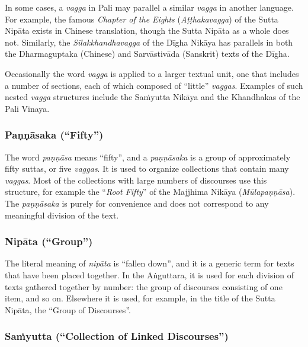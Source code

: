 \documentclass[12pt,openany]{book}%
\begin{document}
In some cases, a \textit{vagga} in Pali may parallel a similar \textit{vagga} in another language. For example, the famous \textit{Chapter of the Eights} (\textit{\textsanskrit{Aṭṭhakavagga}}) of the Sutta \textsanskrit{Nipāta} exists in Chinese translation, though the Sutta \textsanskrit{Nipāta} as a whole does not. Similarly, the \textit{\textsanskrit{Sīlakkhandhavagga}} of the \textsanskrit{Dīgha} \textsanskrit{Nikāya} has parallels in both the Dharmaguptaka (Chinese) and \textsanskrit{Sarvāstivāda} (Sanskrit) texts of the \textsanskrit{Dīgha}.

Occasionally the word \textit{vagga} is applied to a larger textual unit, one that includes a number of sections, each of which composed of “little” \textit{vaggas}. Examples of such nested \textit{vagga} structures include the \textsanskrit{Saṁyutta} \textsanskrit{Nikāya} and the Khandhakas of the Pali Vinaya.

\subsubsection*{\textsanskrit{Paṇṇāsaka} (“Fifty”)}

The word \textit{\textsanskrit{paṇṇāsa}} means “fifty”, and a \textit{\textsanskrit{paṇṇāsaka}} is a group of approximately fifty suttas, or five \textit{vaggas}. It is used to organize collections that contain many \textit{vaggas}. Most of the collections with large numbers of discourses use this structure, for example the “\textit{Root Fifty}” of the Majjhima \textsanskrit{Nikāya} (\textit{\textsanskrit{Mūlapaṇṇāsa}}). The \textit{\textsanskrit{paṇṇāsaka}} is purely for convenience and does not correspond to any meaningful division of the text.

\subsubsection*{\textsanskrit{Nipāta} (“Group”)}

The literal meaning of \textit{\textsanskrit{nipāta}} is “fallen down”, and it is a generic term for texts that have been placed together. In the \textsanskrit{Aṅguttara}, it is used for each division of texts gathered together by number: the group of discourses consisting of one item, and so on. Elsewhere it is used, for example, in the title of the Sutta \textsanskrit{Nipāta}, the “Group of Discourses”.

\subsubsection*{\textsanskrit{Saṁyutta} (“Collection of Linked Discourses”)}
\end{document}
